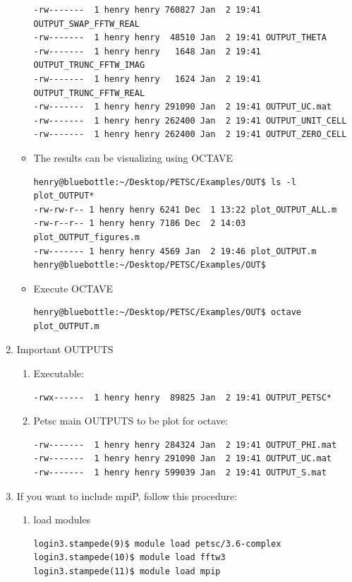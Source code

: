 \documentclass{article}
\begin{document}
\begin{enumerate}
\begin{itemize}
\begin{verbatim}
-rw-------  1 henry henry 760827 Jan  2 19:41 OUTPUT_SWAP_FFTW_REAL
-rw-------  1 henry henry  48510 Jan  2 19:41 OUTPUT_THETA
-rw-------  1 henry henry   1648 Jan  2 19:41 OUTPUT_TRUNC_FFTW_IMAG
-rw-------  1 henry henry   1624 Jan  2 19:41 OUTPUT_TRUNC_FFTW_REAL
-rw-------  1 henry henry 291090 Jan  2 19:41 OUTPUT_UC.mat
-rw-------  1 henry henry 262400 Jan  2 19:41 OUTPUT_UNIT_CELL
-rw-------  1 henry henry 262400 Jan  2 19:41 OUTPUT_ZERO_CELL
\end{verbatim}
\normalsize
\item The results can be visualizing using OCTAVE
\scriptsize
\begin{verbatim}
henry@bluebottle:~/Desktop/PETSC/Examples/OUT$ ls -l plot_OUTPUT*
-rw-rw-r-- 1 henry henry 6241 Dec  1 13:22 plot_OUTPUT_ALL.m
-rw-r--r-- 1 henry henry 7186 Dec  2 14:03 plot_OUTPUT_figures.m
-rw------- 1 henry henry 4569 Jan  2 19:46 plot_OUTPUT.m
henry@bluebottle:~/Desktop/PETSC/Examples/OUT$ 
\end{verbatim}
\normalsize
\item Execute OCTAVE
\scriptsize
\begin{verbatim}
henry@bluebottle:~/Desktop/PETSC/Examples/OUT$ octave plot_OUTPUT.m
\end{verbatim}
\normalsize
\end{itemize}
\item Important OUTPUTS
\begin{enumerate}
\item Executable: 
\scriptsize
\begin{verbatim}
-rwx------  1 henry henry  89825 Jan  2 19:41 OUTPUT_PETSC*
\end{verbatim}
\normalsize
\item Petsc main OUTPUTS to be plot for octave:
\scriptsize
\begin{verbatim}
-rw-------  1 henry henry 284324 Jan  2 19:41 OUTPUT_PHI.mat
-rw-------  1 henry henry 291090 Jan  2 19:41 OUTPUT_UC.mat
-rw-------  1 henry henry 599039 Jan  2 19:41 OUTPUT_S.mat
\end{verbatim}
\normalsize
\end{enumerate}
\item  If you want to include mpiP, follow this procedure:
\begin{enumerate}
 \item  load modules
 \scriptsize
\begin{verbatim}
login3.stampede(9)$ module load petsc/3.6-complex
login3.stampede(10)$ module load fftw3
login3.stampede(11)$ module load mpip

\end{verbatim}
\end{enumerate}
\end{enumerate}
\end{document}
